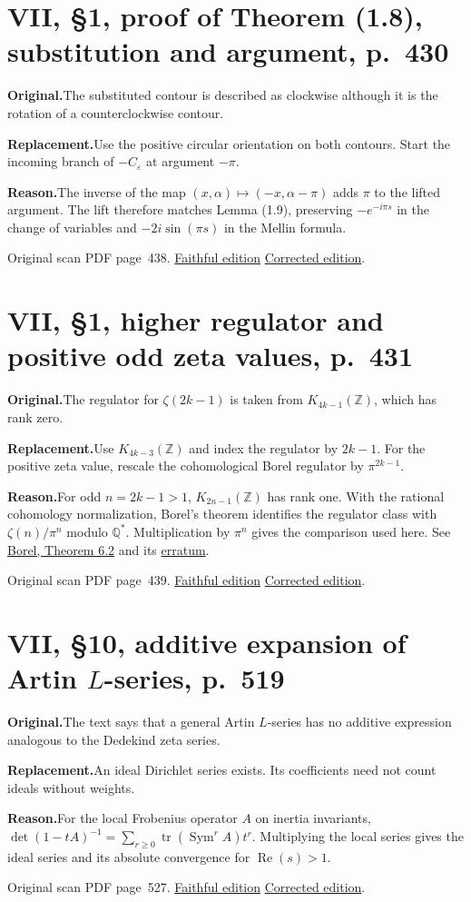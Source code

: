 \documentclass[11pt,a4paper]{article}
\newcommand{\original}{\par\smallskip\noindent\textbf{Original.}\enspace}
\newcommand{\replacement}{\par\smallskip\noindent\textbf{Replacement.}\enspace}
\newcommand{\reason}{\par\smallskip\noindent\textbf{Reason.}\enspace}
\newcommand{\editionlink}[3]{\href{#1\#errata.#2}{#3}}
\newcommand{\location}[2]{%
  \par\smallskip\noindent Original scan PDF page~#2.\enspace
  \editionlink{Neukirch_Faithful.pdf}{#1}{Faithful edition}
  \quad\editionlink{Neukirch_Corrected.pdf}{#1}{Corrected edition}.}
\begin{document}
\setcounter{section}{148}
\section{VII, \S1, proof of Theorem (1.8), substitution and argument, p.~430}\label{errata:item:149}

\original The substituted contour is described as clockwise although it is the rotation of a counterclockwise contour.
\replacement Use the positive circular orientation on both contours. Start the incoming branch of $-C_\varepsilon$ at argument $-\pi$.
\reason The inverse of the map $(x,\alpha)\mapsto(-x,\alpha-\pi)$ adds $\pi$ to the lifted argument. The lift therefore matches Lemma (1.9), preserving $-e^{-i\pi s}$ in the change of variables and $-2i\sin(\pi s)$ in the Mellin formula.
\location{149}{438}

\setcounter{section}{149}
\section{VII, \S1, higher regulator and positive odd zeta values, p.~431}\label{errata:item:150}

\original The regulator for $\zeta(2k-1)$ is taken from $K_{4k-1}(\mathbb Z)$, which has rank zero.
\replacement Use $K_{4k-3}(\mathbb Z)$ and index the regulator by $2k-1$. For the positive zeta value, rescale the cohomological Borel regulator by $\pi^{2k-1}$.
\reason For odd $n=2k-1>1$, $K_{2n-1}(\mathbb Z)$ has rank one. With the rational cohomology normalization, Borel\textquoteright{}s theorem identifies the regulator class with $\zeta(n)/\pi^n$ modulo $\mathbb Q^*$. Multiplication by $\pi^n$ gives the comparison used here. See \href{https://www.numdam.org/item/ASNSP_1977_4_4_4_613_0/}{Borel, Theorem 6.2} and its \href{https://www.numdam.org/item/ASNSP_1980_4_7_2_373_0/}{erratum}.
\location{150}{439}

\setcounter{section}{150}
\section{VII, \S10, additive expansion of Artin $L$-series, p.~519}\label{errata:item:151}

\original The text says that a general Artin $L$-series has no additive expression analogous to the Dedekind zeta series.
\replacement An ideal Dirichlet series exists. Its coefficients need not count ideals without weights.
\reason For the local Frobenius operator $A$ on inertia invariants, $\det(1-tA)^{-1}=\sum_{r\ge0}\operatorname{tr}(\operatorname{Sym}^r A)t^r$. Multiplying the local series gives the ideal series and its absolute convergence for $\operatorname{Re}(s)>1$.
\location{151}{527}
\end{document}
